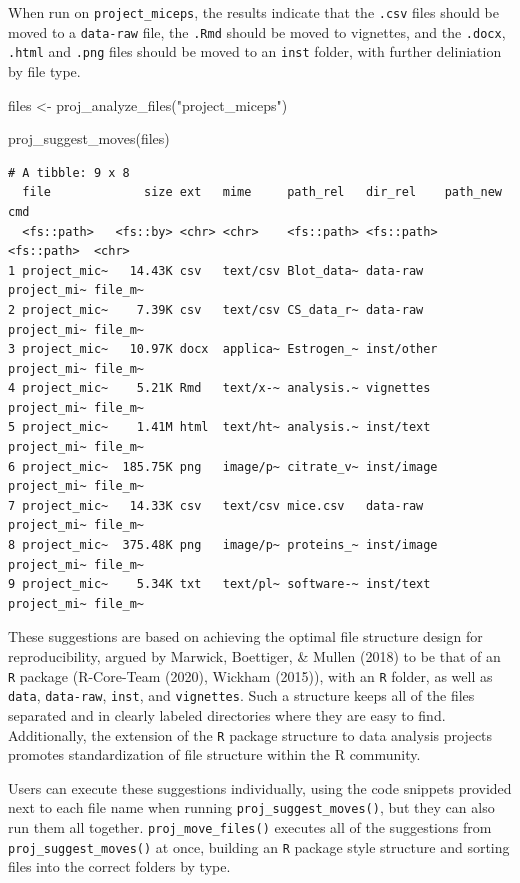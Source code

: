 \documentclass[12pt,twoside]{reedthesis}
\newenvironment{Shaded}{\begin{snugshade}}{\end{snugshade}}
\newcommand{\FunctionTok}[1]{\textcolor[rgb]{0.00,0.00,0.00}{#1}}
\newcommand{\NormalTok}[1]{#1}
\newcommand{\OtherTok}[1]{\textcolor[rgb]{0.56,0.35,0.01}{#1}}
\newcommand{\StringTok}[1]{\textcolor[rgb]{0.31,0.60,0.02}{#1}}
\begin{document}
When run on \texttt{project\_miceps}, the results indicate that the \texttt{.csv} files should be moved to a \texttt{data-raw} file, the \texttt{.Rmd} should be moved to vignettes, and the \texttt{.docx}, \texttt{.html} and \texttt{.png} files should be moved to an \texttt{inst} folder, with further deliniation by file type.
\begin{Shaded}
\begin{Highlighting}[]
\NormalTok{files }\OtherTok{\textless{}{-}} \FunctionTok{proj\_analyze\_files}\NormalTok{(}\StringTok{"project\_miceps"}\NormalTok{)}

\FunctionTok{proj\_suggest\_moves}\NormalTok{(files)}
\end{Highlighting}
\end{Shaded}
\footnotesize
\begin{verbatim}
# A tibble: 9 x 8
  file             size ext   mime     path_rel   dir_rel    path_new    cmd    
  <fs::path>   <fs::by> <chr> <chr>    <fs::path> <fs::path> <fs::path>  <chr>  
1 project_mic~   14.43K csv   text/csv Blot_data~ data-raw   project_mi~ file_m~
2 project_mic~    7.39K csv   text/csv CS_data_r~ data-raw   project_mi~ file_m~
3 project_mic~   10.97K docx  applica~ Estrogen_~ inst/other project_mi~ file_m~
4 project_mic~    5.21K Rmd   text/x-~ analysis.~ vignettes  project_mi~ file_m~
5 project_mic~    1.41M html  text/ht~ analysis.~ inst/text  project_mi~ file_m~
6 project_mic~  185.75K png   image/p~ citrate_v~ inst/image project_mi~ file_m~
7 project_mic~   14.33K csv   text/csv mice.csv   data-raw   project_mi~ file_m~
8 project_mic~  375.48K png   image/p~ proteins_~ inst/image project_mi~ file_m~
9 project_mic~    5.34K txt   text/pl~ software-~ inst/text  project_mi~ file_m~
\end{verbatim}
\normalsize

These suggestions are based on achieving the optimal file structure design for reproducibility, argued by Marwick, Boettiger, \& Mullen (2018) to be that of an \texttt{R} package (R-Core-Team (2020), Wickham (2015)), with an \texttt{R} folder, as well as \texttt{data}, \texttt{data-raw}, \texttt{inst}, and \texttt{vignettes}. Such a structure keeps all of the files separated and in clearly labeled directories where they are easy to find. Additionally, the extension of the \texttt{R} package structure to data analysis projects promotes standardization of file structure within the R community.

Users can execute these suggestions individually, using the code snippets provided next to each file name when running \texttt{proj\_suggest\_moves()}, but they can also run them all together. \texttt{proj\_move\_files()} executes all of the suggestions from \texttt{proj\_suggest\_moves()} at once, building an \texttt{R} package style structure and sorting files into the correct folders by type.
\end{document}
